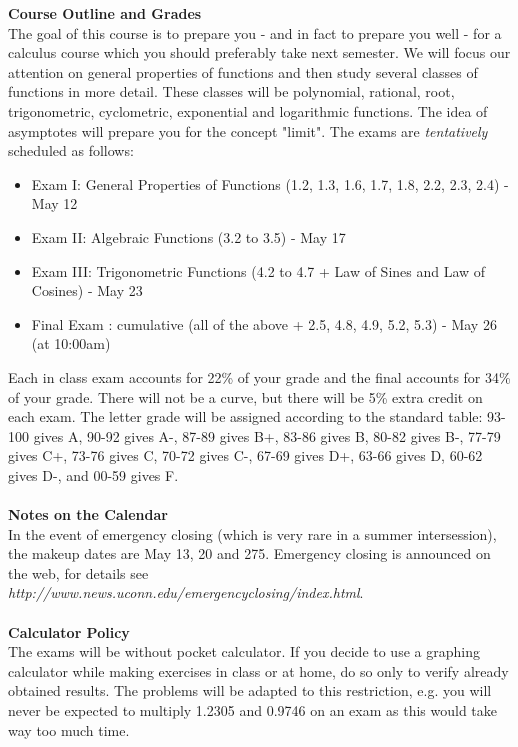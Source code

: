 \documentclass [11pt]{article}
\begin{document}
   {\bf Course Outline and Grades}\\
   The goal of this course is to prepare you - and in fact to prepare you well - for a calculus course
   which you should preferably take next semester. We will focus our attention on general properties
   of functions and then study several classes of functions in more detail. 
   These classes will be polynomial, rational, root, trigonometric, cyclometric, exponential and logarithmic functions.
   The idea of asymptotes will prepare you for the concept "limit".  
   The exams are {\it tentatively} scheduled as follows:
   \begin{itemize}
     \item Exam I: General Properties of Functions (1.2, 1.3, 1.6, 1.7, 1.8, 2.2, 2.3, 2.4) - May 12          
     \item Exam II: Algebraic Functions (3.2 to 3.5) - May 17           
     \item Exam III: Trigonometric Functions (4.2 to 4.7 + Law of Sines and Law of Cosines) - May 23                
     \item Final Exam : cumulative (all of the above + 2.5, 4.8, 4.9, 5.2, 5.3) - May 26 (at 10:00am)
   \end{itemize}
   Each in class exam accounts for 22\% of your grade and the final accounts for 34\% of your grade.
   There will not be a curve, but there will be 5\% extra credit on each exam.
   The letter grade will be assigned according to the standard table:   
   93-100 gives A, 90-92 gives A-, 87-89 gives B+, 83-86 gives B, 80-82 gives B-,
   77-79 gives C+, 73-76 gives C, 70-72 gives C-, 67-69 gives D+, 63-66 gives D,
   60-62 gives D-, and 00-59 gives F.\\
   \ \\

   {\bf Notes on the Calendar}\\
   In the event of emergency closing (which is very rare in a summer intersession), the          
   makeup dates are May 13, 20 and 275. Emergency closing is announced on the web, for details 
   see \\
   {\it http://www.news.uconn.edu/emergencyclosing/index.html}. \\
   \ \\  
 
   {\bf Calculator Policy}\\
   The exams will be without pocket calculator. If you decide to use a graphing calculator while making
   exercises in class or at home, do so only to verify already obtained results. The problems will be 
   adapted to this restriction, e.g.  you will never be expected to multiply 1.2305 and 0.9746 on an 
   exam as this would take way too much time.
   \ \\
\end{document}
